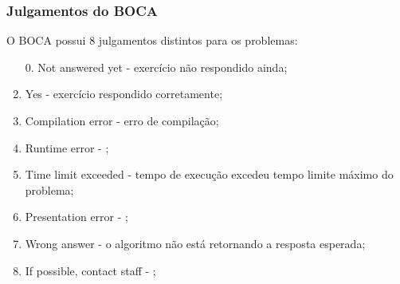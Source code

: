\begin{frame}
 \frametitle{Julgamentos do BOCA}
O BOCA possui 8 julgamentos distintos para os problemas:
 \begin{enumerate}
  \item[0.] Not answered yet - exercício não respondido ainda;
  \item Yes - exercício respondido corretamente;
  \item Compilation error - erro de compilação;
  \item Runtime error - ;
  \item Time limit exceeded - tempo de execução excedeu tempo limite máximo do problema;
  \item Presentation error - ;
  \item Wrong answer - o algoritmo não está retornando a resposta esperada;
  \item If possible, contact staff - ;
 \end{enumerate}
\end{frame}
